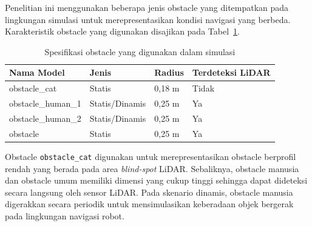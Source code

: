 Penelitian ini menggunakan beberapa jenis obstacle yang ditempatkan pada lingkungan simulasi untuk merepresentasikan kondisi navigasi yang berbeda. Karakteristik obstacle yang digunakan disajikan pada Tabel~\ref{tab:spesifikasi_obstacle}.

\begin{table}[H]
\centering
\caption{Spesifikasi obstacle yang digunakan dalam simulasi}
\label{tab:spesifikasi_obstacle}
\begin{tabular}{llll}
\toprule
\textbf{Nama Model} & \textbf{Jenis} & \textbf{Radius} & \textbf{Terdeteksi LiDAR} \\
\midrule
obstacle\_cat & Statis & 0,18 m & Tidak \\
obstacle\_human\_1 & Statis/Dinamis & 0,25 m & Ya \\
obstacle\_human\_2 & Statis/Dinamis & 0,25 m & Ya \\
obstacle & Statis & 0,25 m & Ya \\
\bottomrule
\end{tabular}
\end{table}

Obstacle \texttt{obstacle\_cat} digunakan untuk merepresentasikan obstacle berprofil rendah yang berada pada area \textit{blind-spot} LiDAR. Sebaliknya, obstacle manusia dan obstacle umum memiliki dimensi yang cukup tinggi sehingga dapat dideteksi secara langsung oleh sensor LiDAR. Pada skenario dinamis, obstacle manusia digerakkan secara periodik untuk mensimulasikan keberadaan objek bergerak pada lingkungan navigasi robot.